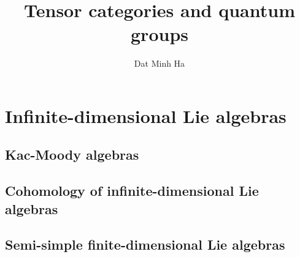 

\setcounter{chapter}{-1}
\setcounter{section}{-1}





    \title{Tensor categories and quantum groups}
    
    \author{Dat Minh Ha}
    \maketitle
    
    \begin{abstract}
        
    \end{abstract}
    
    {
      \hypersetup{} 
      \dominitoc
      \tableofcontents %
    }
    
    

    \part{Infinite-dimensional Lie algebras}
        \chapter{Kac-Moody algebras}
            \begin{abstract}
            
            \end{abstract}
            
            \minitoc

            

            

            

        \chapter{Cohomology of infinite-dimensional Lie algebras}

        \begin{appendices}
            \chapter{Semi-simple finite-dimensional Lie algebras}
            \begin{abstract}
            
            \end{abstract}
            
            \minitoc
            
        \end{appendices}
    
